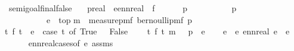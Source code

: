 \begin{isabellebody}
\isamarkupfalse%
%
\endisatagproof
{\isafoldproof}%
%
\isadelimproof
\isanewline
%
\endisadelimproof
\isanewline
\isanewline
{}\isamarkupfalse%
\ semi{\isacharunderscore}{\kern0pt}goal{}{\isacharunderscore}{\kern0pt}final{\isacharunderscore}{\kern0pt}false{\isacharcolon}{\kern0pt}\isanewline
\ \ \ p{}{\isacharcolon}{\kern0pt}{\isacharcolon}{\kern0pt}real\ \ e{\isacharcolon}{\kern0pt}{\isacharcolon}{\kern0pt}ennreal\ \ f\isanewline
\ \ \ \ {\isachardoublequoteopen}{}\ {\isasymle}\ p{}{\isachardoublequoteclose}\isanewline
\ \ \ \ \ \ \ \ \ \ {\isachardoublequoteopen}p{}\ {\isasymle}\ {}{\isachardoublequoteclose}\isanewline
\ \ \ \ \ \ \ \ \ \ {\isachardoublequoteopen}e\ {\isasymnoteq}\ top{\isachardoublequoteclose}\isanewline
{\isachardoublequoteopen}m\ {\isacharequal}{\kern0pt}\ measure{\isacharunderscore}{\kern0pt}pmf\ {\isacharparenleft}{\kern0pt}bernoulli{\isacharunderscore}{\kern0pt}pmf\ p{}{\isacharparenright}{\kern0pt}{\isachardoublequoteclose}\isanewline
{\isachardoublequoteopen}{\isasymAnd}t{\isachardot}{\kern0pt}\ f\ t\ {\isacharequal}{\kern0pt}\ e\ {\isacharasterisk}{\kern0pt}\ {\isacharparenleft}{\kern0pt}case\ t\ of\ True\ {\isasymRightarrow}\ {}{\isacharbar}{\kern0pt}\ False\ {\isasymRightarrow}\ {}{\isacharparenright}{\kern0pt}{\isachardoublequoteclose}\isanewline
{}\ {\isachardoublequoteopen}{\isasymintegral}\isactrlsup {\isacharplus}{\kern0pt}\ t{\isachardot}{\kern0pt}\ {\isacharparenleft}{\kern0pt}f\ t{\isacharparenright}{\kern0pt}\ {\isasympartial}m\ {\isacharequal}{\kern0pt}{\isacharparenleft}{\kern0pt}{}\ {\isacharminus}{\kern0pt}\ p{}{\isacharparenright}{\kern0pt}\ {\isacharasterisk}{\kern0pt}\ e{\isachardoublequoteclose}\isanewline
%
\isadelimproof
%
\endisadelimproof
%
\isatagproof
{}\isamarkupfalse%
{\isacharminus}{\kern0pt}\isanewline
\ \ \isamarkupfalse%
\ e{}\ \ {\isachardoublequoteopen}e{}{\isasymge}{}{\isachardoublequoteclose}\ {\isachardoublequoteopen}ennreal\ e{}\ {\isacharequal}{\kern0pt}\ e{\isachardoublequoteclose}\isanewline
\ \ \ \ \isamarkupfalse%
\ ennreal{\isacharunderscore}{\kern0pt}cases{\isacharbrackleft}{\kern0pt}of\ e{\isacharbrackright}{\kern0pt}\ assms{\isacharparenleft}{\kern0pt}{}{\isacharparenright}{\kern0pt}\isanewline

\end{isabellebody}
